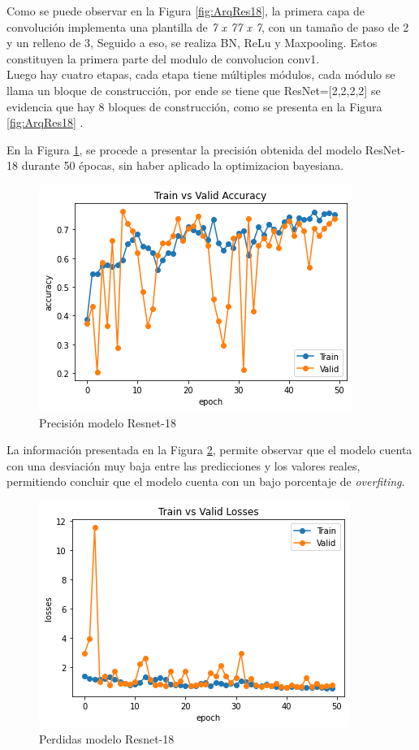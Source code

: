 				Como se puede observar en la Figura \ref{fig:ArqRes18}, la primera capa de convolución implementa una plantilla de \textit{7 x 77 x 7}, con un tamaño de paso de 2 y un relleno de 3, Seguido a eso, se realiza BN, ReLu y Maxpooling. Estos constituyen la primera parte del modulo de convolucion conv1.\\
					
				Luego hay cuatro etapas, cada etapa tiene múltiples módulos, cada módulo se llama un bloque de construcción, por ende se tiene que ResNet=[2,2,2,2] se evidencia que hay 8 bloques de construcción, como se presenta en la Figura \ref{fig:ArqRes18} \cite{ref_5}.				
		

\newpage	
		En la Figura \ref{fig:preci_RESNET18}, se procede a presentar la precisión obtenida del modelo ResNet-18 durante 50 épocas, sin haber aplicado la optimizacion bayesiana.
		
		\begin{figure}[ht]
			\centering
			\includegraphics[scale=0.55]{Figs/109.png}
			\caption{Precisión modelo Resnet-18}
			\label{fig:preci_RESNET18}
		\end{figure}
	
		La información presentada en la Figura \ref{fig:perdda_RESNET18}, permite observar que el modelo cuenta con una desviación muy baja entre las predicciones y los valores reales, permitiendo concluir que el modelo cuenta con un bajo porcentaje de \textit{overfiting}. 
		
		\begin{figure}[ht]
			\centering
			\includegraphics[scale=0.55]{Figs/110.png}
			\caption{Perdidas modelo Resnet-18}
			\label{fig:perdda_RESNET18}
		\end{figure}

